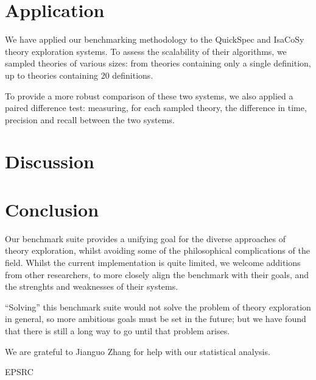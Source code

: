 \section{Application}
\label{sec:application}


We have applied our benchmarking methodology to the QuickSpec and IsaCoSy theory
exploration systems. To assess the scalability of their algorithms, we sampled
theories of various sizes: from theories containing only a single definition, up
to theories containing 20 definitions.

To provide a more robust comparison of these two systems, we also applied a
paired difference test: measuring, for each sampled theory, the difference in
time, precision and recall between the two systems.

\section{Discussion}
\label{sec:discussion}


\section{Conclusion}
\label{sec:conclusion}


Our benchmark suite provides a unifying goal for the diverse approaches of
theory exploration, whilst avoiding some of the philosophical complications of
the field. Whilst the current implementation is quite limited, we welcome
additions from other researchers, to more closely align the benchmark with their
goals, and the strenghts and weaknesses of their systems.

``Solving'' this benchmark suite would not solve the problem of theory exploration in general,
so more ambitious goals must be set in the future; but we have found that there is still a
long way to go until that problem arises.

\begin{acknowledgements}
  We are grateful to Jianguo Zhang for help with our statistical analysis.

  EPSRC
\end{acknowledgements}





